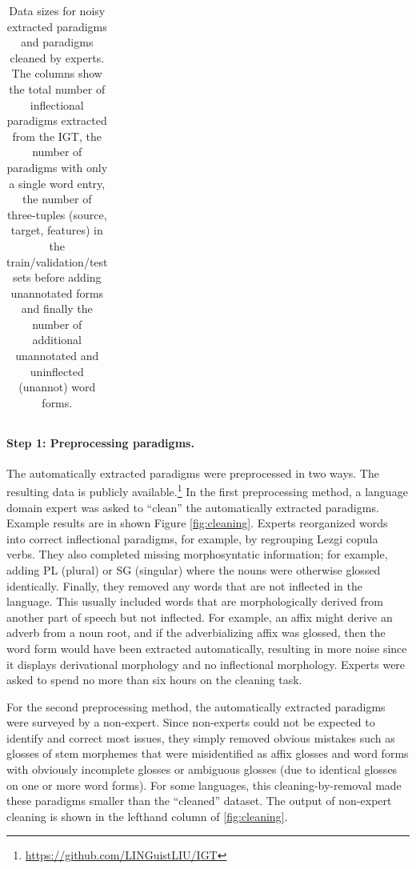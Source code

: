 \begin{table}[!tb]
\begin{tabular}{l|ccccccc}
    \end{tabular}
    \caption[IGT2P data]{Data sizes for noisy extracted paradigms and paradigms cleaned by experts. The columns show the total number of inflectional paradigms extracted from the IGT, the number of paradigms with only a single word entry, the number of three-tuples (source, target, features) in the train/validation/test sets before adding unannotated forms and finally the number of additional unannotated and uninflected (unannot) word forms.}
    \label{tab:IGT2Pdata}
\end{table}


\paragraph{Step 1: Preprocessing paradigms.}
The automatically extracted paradigms were preprocessed in two ways. The resulting data is publicly available.\footnote{\url{https://github.com/LINGuistLIU/IGT}}
In the first preprocessing method, a language domain expert was asked to ``clean'' the automatically extracted paradigms. Example results are in shown Figure \ref{fig:cleaning}. Experts reorganized words into correct inflectional paradigms, for example, by regrouping Lezgi copula verbs. They also completed missing morphosyntatic information; for example, adding PL (plural) or SG (singular) where the nouns were otherwise glossed identically. Finally, they removed any words that are not inflected in the language. This usually included words that are morphologically derived from another part of speech but not inflected. For example, an affix might derive an adverb from a noun root, and if the adverbializing affix was glossed, then the word form would have been extracted automatically, resulting in more noise since it displays derivational morphology and no inflectional morphology. Experts were asked to spend no more than six hours on the cleaning task. 

For the second preprocessing method, the automatically extracted paradigms were surveyed by a non-expert. Since non-experts could not be expected to identify and correct most issues, they simply removed obvious mistakes such as glosses of stem morphemes that were misidentified as affix glosses and word forms with obviously incomplete glosses or ambiguous glosses (due to identical glosses on one or more word forms). For some languages, this cleaning-by-removal made these paradigms smaller than the ``cleaned'' dataset. The output of non-expert cleaning is shown in the lefthand column of \autoref{fig:cleaning}.

